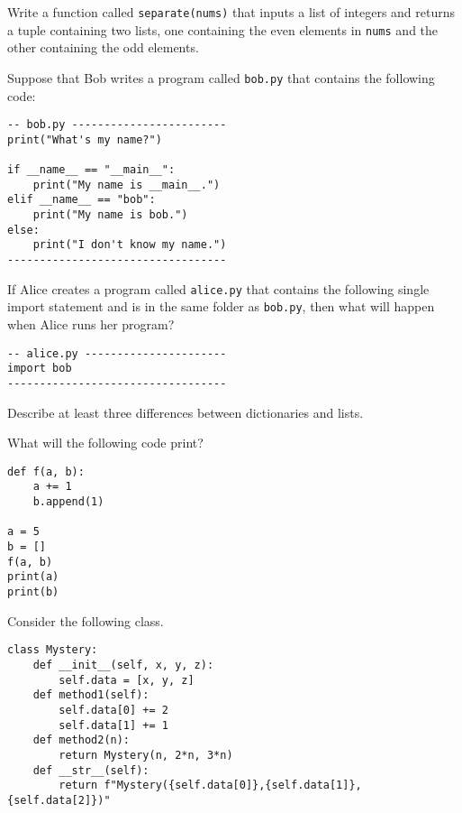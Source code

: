 \documentclass[12pt]{exam}
\begin{document}
\begin{questions}
\question Write a function called \verb|separate(nums)| that inputs a list of integers and returns a tuple containing two lists, one containing the even elements in \verb|nums| and the other containing the odd elements.  
\vfill

\question Suppose that Bob writes a program called \verb|bob.py| that contains the following code:
\begin{verbatim}
-- bob.py ------------------------
print("What's my name?")

if __name__ == "__main__":
    print("My name is __main__.")
elif __name__ == "bob":
    print("My name is bob.")
else:
    print("I don't know my name.")
----------------------------------
\end{verbatim}

If Alice creates a program called \verb|alice.py| that contains the following single import statement and is in the same folder as \verb|bob.py|, then what will happen when Alice runs her program? 
\begin{verbatim}
-- alice.py ----------------------
import bob
----------------------------------
\end{verbatim}
\bigskip

\newpage
\question Describe at least three differences between dictionaries and lists.  
\vfill

\question What will the following code print? 
\begin{verbatim}
def f(a, b):
    a += 1
    b.append(1)

a = 5
b = []
f(a, b)
print(a)
print(b)
\end{verbatim}
\bigskip
\bigskip

\question Consider the following class.  

\begin{verbatim}
class Mystery:
    def __init__(self, x, y, z):
        self.data = [x, y, z]
    def method1(self):
        self.data[0] += 2
        self.data[1] += 1
    def method2(n):
        return Mystery(n, 2*n, 3*n)
    def __str__(self):
        return f"Mystery({self.data[0]},{self.data[1]},{self.data[2]})"
\end{verbatim} 

\end{questions}
\end{document}
